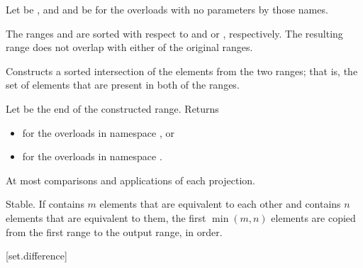 \begin{itemdescr}
\pnum
Let  be ,
and  and  be 
for the overloads with no parameters by those names.

\pnum
\expects
The ranges  and  are sorted
with respect to  and  or , respectively.
The resulting range does not overlap with either of the original ranges.

\pnum
\effects
Constructs a sorted intersection of the elements from the two ranges;
that is, the set of elements that are present in both of the ranges.

\pnum
\returns
Let  be the end of the constructed range.
Returns
\begin{itemize}
\item
  for the overloads in namespace , or
\item
  for the overloads in namespace .
\end{itemize}

\pnum
\complexity
At most 
comparisons and applications of each projection.

\pnum
\remarks
Stable.
If  contains $m$ elements
that are equivalent to each other and
 contains $n$ elements
that are equivalent to them,
the first $\min(m, n)$ elements
are copied from the first range to the output range, in order.
\end{itemdescr}

[set.difference]{}

